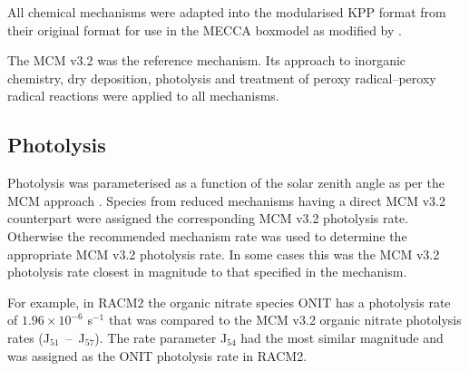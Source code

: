 All chemical mechanisms were adapted into the modularised KPP \citep{Damian:2002} format from their original format for use in the MECCA boxmodel \citep{Sander:2005} as modified by \citep{Butler:2011}.

The MCM v3.2 \citep{Jenkin:1997, Jenkin:2003, Saunders:2003, Bloss:2005, MCM_Site} was the reference mechanism. 
Its approach to inorganic chemistry, dry deposition, photolysis and treatment of peroxy radical--peroxy radical reactions were applied to all mechanisms. 

\subsection{Photolysis} \label{ss:photolysis}
Photolysis was parameterised as a function of the solar zenith angle as per the MCM approach \citep{Saunders:2003}. 
Species from reduced mechanisms having a direct MCM v3.2 counterpart were assigned the corresponding MCM v3.2 photolysis rate. 
Otherwise the recommended mechanism rate was used to determine the appropriate MCM v3.2 photolysis rate. 
In some cases this was the MCM v3.2 photolysis rate closest in magnitude to that specified in the mechanism. 

For example, in RACM2 the organic nitrate species ONIT has a photolysis rate of $1.96 \times 10^{-6}$ s$^{-1}$ that was compared to the MCM v3.2 organic nitrate photolysis rates \mbox{(J$_{51}$ -- J$_{57}$)}. 
The rate parameter J$_{54}$ had the most similar magnitude and was assigned as the ONIT photolysis rate in RACM2.

